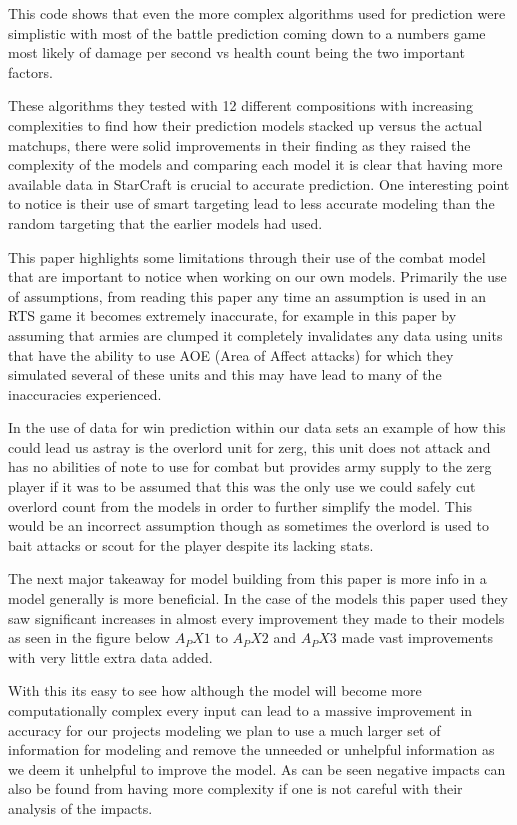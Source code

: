 \documentclass[a4paper,12pt]{report}
\begin{document}
This code shows that even the more complex algorithms used for prediction were simplistic with most of the battle prediction coming down to a numbers game most likely of damage per second vs health count being the two important factors.

These algorithms they tested with 12 different compositions with increasing complexities to find how their prediction models stacked up versus the actual matchups, there were solid improvements in their finding as they raised the complexity of the models and comparing each model it is clear that having more available data in StarCraft is crucial to accurate prediction. One interesting point to notice is their use of smart targeting lead to less accurate modeling than the random targeting that the earlier models had used.

This paper highlights some limitations through their use of the combat model that are important to notice when working on our own models. Primarily the use of assumptions, from reading this paper any time an assumption is used in an RTS game it becomes extremely inaccurate, for example in this paper by assuming that armies are clumped it completely invalidates any data using units that have the ability to use AOE (Area of Affect attacks) for which they simulated several of these units and this may have lead to many of the inaccuracies experienced.

In the use of data for win prediction within our data sets an example of how this could lead us astray is the overlord unit for zerg, this unit does not attack and has no abilities of note to use for combat but provides army supply to the zerg player if it was to be assumed that this was the only use we could safely cut overlord count from the models in order to further simplify the model. This would be an incorrect assumption though as sometimes the overlord is used to bait attacks or scout for the player despite its lacking stats.

The next major takeaway for model building from this paper is more info in a model generally is more beneficial. In the case of the models this paper used they saw significant increases in almost every improvement they made to their models as seen in the figure below $A_PX1$ to $A_PX2$ and $A_PX3$ made vast improvements with very little extra data added.

With this its easy to see how although the model will become more computationally complex every input can lead to a massive improvement in accuracy for our projects modeling we plan to use a much larger set of information for modeling and remove the unneeded or unhelpful information as we deem it unhelpful to improve the model. As can be seen negative impacts can also be found from having more complexity if one is not careful with their analysis of the impacts.
\end{document}
